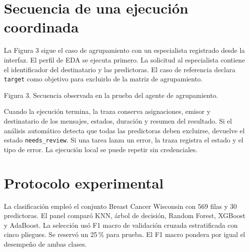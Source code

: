 \documentclass[11pt,a4paper]{article}
\begin{document}
\section{Secuencia de una ejecución coordinada}

La Figura 3 sigue el caso de agrupamiento con un especialista registrado desde la interfaz. El perfil de EDA se ejecuta primero. La solicitud al especialista contiene el identificador del destinatario y las predictoras. El caso de referencia declara \texttt{target} como objetivo para excluirlo de la matriz de agrupamiento.

\begin{center}

\small Figura 3. Secuencia observada en la prueba del agente de agrupamiento.
\end{center}

Cuando la ejecución termina, la traza conserva asignaciones, emisor y destinatario de los mensajes, estados, duración y resumen del resultado. Si el análisis automático detecta que todas las predictoras deben excluirse, devuelve el estado \texttt{needs\_review}. Si una tarea lanza un error, la traza registra el estado y el tipo de error. La ejecución local se puede repetir sin credenciales.

\section{Protocolo experimental}

La clasificación empleó el conjunto Breast Cancer Wisconsin con 569 filas y 30 predictoras. El panel comparó KNN, árbol de decisión, Random Forest, XGBoost y AdaBoost. La selección usó F1 macro de validación cruzada estratificada con cinco pliegues. Se reservó un 25\,\% para prueba. El F1 macro pondera por igual el desempeño de ambas clases.
\end{document}
